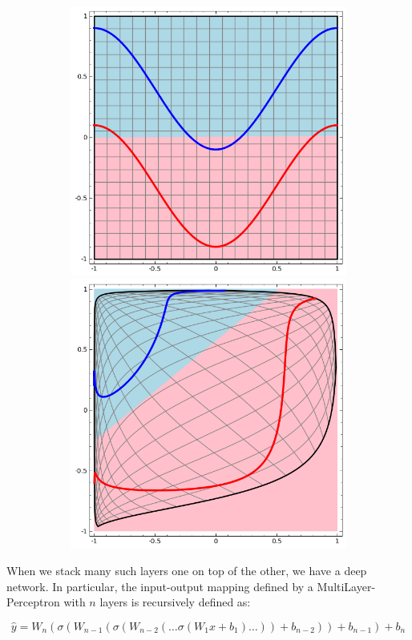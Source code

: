 \documentclass[../main.tex]{subfiles}
\begin{document}
    \begin{figure}[h!]
        \centering
        \begin{subfigure}{\linewidth}
            \centering
        	\includegraphics[width=.5\linewidth]{img/non-linearly-separable.png}\label{fig:nonlinearsep}\hfill
        	\includegraphics[width=.5\linewidth]{img/linearly-separable.png}\label{fig:linearsep}
        \end{subfigure}
        \label{fig:linear-layer-viz}
	\end{figure}


    When we stack many such layers one on top of the other, we have a deep network. In particular, the input-output mapping defined by
    a MultiLayer-Perceptron with $n$ layers is recursively defined as:

    \begin{equation}
        \hat{y} = W_{n}(\sigma(W_{n-1}(\sigma(W_{n-2}(\ldots \sigma(W_{1} x + b_{1}) \ldots)) + b_{n-2})) + b_{n-1}) + b_{n} 
    \end{equation}
\end{document}
